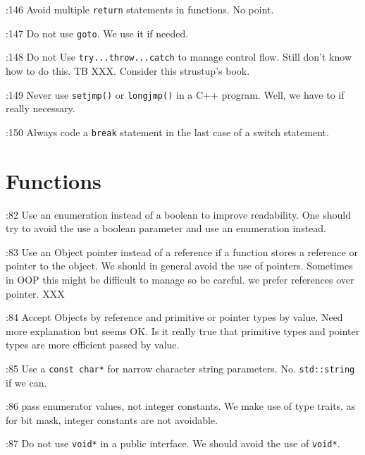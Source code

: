 \documentclass{book}
\newcommand{\name}[1]{\texttt{#1}}
\begin{document}
\cite{OKL_MisfeldtBumgardnerGray2004CppStyle}:146 Avoid multiple \name{return} statements in functions. No point.

\cite{OKL_MisfeldtBumgardnerGray2004CppStyle}:147 Do not use \name{goto}. We use it if needed. 

\cite{OKL_MisfeldtBumgardnerGray2004CppStyle}:148 Do not Use \name{try...throw...catch} to manage control flow. Still don't know how to do this. TB XXX.  Consider this strustup's book. 

\cite{OKL_MisfeldtBumgardnerGray2004CppStyle}:149 Never use \name{setjmp()} or \name{longjmp()} in a C++ program. Well, we have to if really necessary. 

\cite{OKL_MisfeldtBumgardnerGray2004CppStyle}:150 Always code a \name{break} statement in the last case of a switch statement. 







\chapter{Functions}
\label{cha:Functions}

\cite{OKL_MisfeldtBumgardnerGray2004CppStyle}:82 Use an enumeration instead of a boolean to improve readability. One should try to avoid the use a boolean parameter and use an enumeration instead.

\cite{OKL_MisfeldtBumgardnerGray2004CppStyle}:83 Use an Object pointer instead of a reference if a function stores a reference or pointer to the object. We should in general avoid the use of pointers. Sometimes in OOP this might be difficult to manage so be careful.  we prefer references over pointer. XXX

\cite{OKL_MisfeldtBumgardnerGray2004CppStyle}:84 Accept Objects by reference and primitive or pointer types by value. Need more explanation but seems OK. Is it really true that primitive types and pointer types are more efficient passed by value.

\cite{OKL_MisfeldtBumgardnerGray2004CppStyle}:85 Use a \name{const char*} for narrow character string parameters. No. \name{std::string} if we can.

\cite{OKL_MisfeldtBumgardnerGray2004CppStyle}:86 pass enumerator values, not integer constants.  We make use of type traits, as for bit mask, integer constants are not avoidable.

\cite{OKL_MisfeldtBumgardnerGray2004CppStyle}:87 Do not use \name{void*} in a public interface. We should avoid the use of \name{void*}. 
\end{document}
